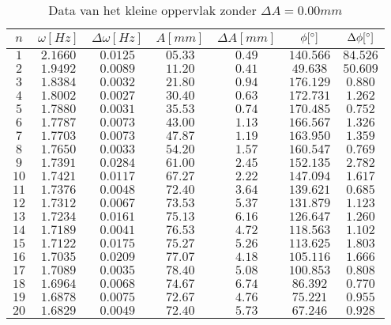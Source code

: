 \documentclass[12pt,a4]{article}
\begin{document}
\begin{table}[h]
\centering
\caption{Data van het kleine oppervlak zonder $\Delta A = 0.00mm$}
\begin{tabular}{c | c | c | c | c | c | c }
$ n $&$\omega [Hz] $&$ \Delta\omega [Hz] $&$ A [mm] $&$ \Delta A [mm] $&$ \phi [\degree] $&$ \Delta \phi [\degree] $\\
\hline
$ 1 $&$ 2.1660 $&$ 0.0125 $&$ 05.33 $&$ 0.49 $&$ 140.566 $&$ 84.526 $\\
$ 2 $&$ 1.9492 $&$ 0.0089 $&$ 11.20 $&$ 0.41 $&$ 49.638 $&$ 50.609 $\\
$ 3 $&$ 1.8384 $&$ 0.0032 $&$ 21.80 $&$ 0.94 $&$ 176.129 $&$ 0.880 $\\
$ 4 $&$ 1.8002 $&$ 0.0027 $&$ 30.40 $&$ 0.63 $&$ 172.731 $&$ 1.262 $\\
$ 5 $&$ 1.7880 $&$ 0.0031 $&$ 35.53 $&$ 0.74 $&$ 170.485 $&$ 0.752 $\\
$ 6 $&$ 1.7787 $&$ 0.0073 $&$ 43.00 $&$ 1.13 $&$ 166.567 $&$ 1.326 $\\
$ 7 $&$ 1.7703 $&$ 0.0073 $&$ 47.87 $&$ 1.19 $&$ 163.950 $&$ 1.359 $\\
$ 8 $&$ 1.7650 $&$ 0.0033 $&$ 54.20 $&$ 1.57 $&$ 160.547 $&$ 0.769 $\\
$ 9 $&$ 1.7391 $&$ 0.0284 $&$ 61.00 $&$ 2.45 $&$ 152.135 $&$ 2.782 $\\
$ 10 $&$ 1.7421 $&$ 0.0117 $&$ 67.27 $&$ 2.22 $&$ 147.094 $&$ 1.617 $\\
$ 11 $&$ 1.7376 $&$ 0.0048 $&$ 72.40 $&$ 3.64 $&$ 139.621 $&$ 0.685 $\\
$ 12 $&$ 1.7312 $&$ 0.0067 $&$ 73.53 $&$ 5.37 $&$ 131.879 $&$ 1.123 $\\
$ 13 $&$ 1.7234 $&$ 0.0161 $&$ 75.13 $&$ 6.16 $&$ 126.647 $&$ 1.260 $\\
$ 14 $&$ 1.7189 $&$ 0.0041 $&$ 76.53 $&$ 4.72 $&$ 118.563 $&$ 1.102 $\\
$ 15 $&$ 1.7122 $&$ 0.0175 $&$ 75.27 $&$ 5.26 $&$ 113.625 $&$ 1.803 $\\
$ 16 $&$ 1.7035 $&$ 0.0209 $&$ 77.07 $&$ 4.18 $&$ 105.116 $&$ 1.666 $\\
$ 17 $&$ 1.7089 $&$ 0.0035 $&$ 78.40 $&$ 5.08 $&$ 100.853 $&$ 0.808 $\\
$ 18 $&$ 1.6964 $&$ 0.0068 $&$ 74.67 $&$ 6.74 $&$ 86.392 $&$ 0.770 $\\
$ 19 $&$ 1.6878 $&$ 0.0075 $&$ 72.67 $&$ 4.76 $&$ 75.221 $&$ 0.955 $\\
$ 20 $&$ 1.6829 $&$ 0.0049 $&$ 72.40 $&$ 5.73 $&$ 67.246 $&$ 0.928 $\\

\end{tabular}
\end{table}
\end{document}
